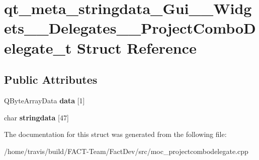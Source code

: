 \hypertarget{structqt__meta__stringdata__Gui____Widgets____Delegates____ProjectComboDelegate__t}{\section{qt\-\_\-meta\-\_\-stringdata\-\_\-\-Gui\-\_\-\-\_\-\-Widgets\-\_\-\-\_\-\-Delegates\-\_\-\-\_\-\-Project\-Combo\-Delegate\-\_\-t Struct Reference}
\label{structqt__meta__stringdata__Gui____Widgets____Delegates____ProjectComboDelegate__t}
}
\subsection*{Public Attributes}
\begin{DoxyCompactItemize}
\item 
\hypertarget{structqt__meta__stringdata__Gui____Widgets____Delegates____ProjectComboDelegate__t_acca76779c8a21c0762788ec49099bd00}{Q\-Byte\-Array\-Data {\bfseries data} \mbox{[}1\mbox{]}}\label{structqt__meta__stringdata__Gui____Widgets____Delegates____ProjectComboDelegate__t_acca76779c8a21c0762788ec49099bd00}

\item 
\hypertarget{structqt__meta__stringdata__Gui____Widgets____Delegates____ProjectComboDelegate__t_ab17cabd1564831a36a363b6c48e53a36}{char {\bfseries stringdata} \mbox{[}47\mbox{]}}\label{structqt__meta__stringdata__Gui____Widgets____Delegates____ProjectComboDelegate__t_ab17cabd1564831a36a363b6c48e53a36}

\end{DoxyCompactItemize}


The documentation for this struct was generated from the following file\-:\begin{DoxyCompactItemize}
\item 
/home/travis/build/\-F\-A\-C\-T-\/\-Team/\-Fact\-Dev/src/moc\-\_\-projectcombodelegate.\-cpp\end{DoxyCompactItemize}
